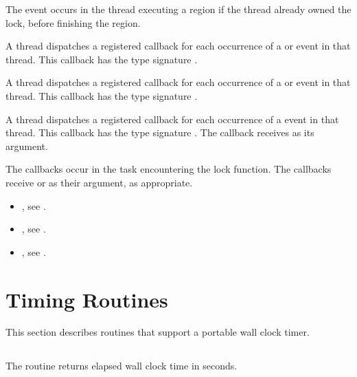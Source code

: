 The  event occurs in the thread
executing a  region
if the thread already owned the lock,
before finishing the region.


\tools

A thread dispatches a registered 
callback for each occurrence of a  or  event
in that thread.  This callback has the type signature .

A thread dispatches a registered 
callback for each occurrence of a  or  event
in that thread.  This callback has the type signature .

A thread dispatches a registered 
callback for each occurrence of a  event
in that thread. This callback has the type signature .
The callback receives  as its  argument.

The callbacks occur in the task encountering
the lock function.  The callbacks receive  or
  as their  argument, as appropriate.


\crossreferences
\begin{itemize}
\item {}, see
.
\item {}, see
.
\item {}, see
.
\end{itemize}

\section{Timing Routines}
\label{sec:Timing Routines}
This section describes routines that support a portable wall clock timer.











\subsection{}
\label{subsec:omp_get_wtime}
\summary
The  routine returns elapsed wall clock time in seconds.


